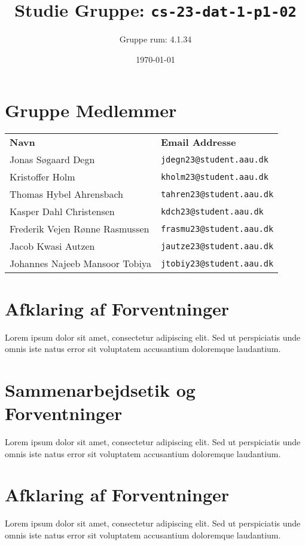 \documentclass{article}
\begin{document}
\title{Studie Gruppe: \texttt{cs-23-dat-1-p1-02}}
\author{Gruppe rum: 4.1.34}
\date{\today}
\maketitle

\section*{Gruppe Medlemmer}
\begin{tabular}{ll}
\textbf{Navn} & \textbf{Email Addresse} \\
Jonas Søgaard Degn & \texttt{jdegn23@student.aau.dk} \\
Kristoffer Holm& \texttt{kholm23@student.aau.dk} \\
Thomas Hybel Ahrensbach & \texttt{tahren23@student.aau.dk} \\
Kasper Dahl Christensen & \texttt{kdch23@student.aau.dk} \\
Frederik Vejen Rønne Rasmussen & \texttt{frasmu23@student.aau.dk} \\
Jacob Kwasi Autzen & \texttt{jautze23@student.aau.dk} \\
Johannes Najeeb Mansoor Tobiya & \texttt{jtobiy23@student.aau.dk} \\
\end{tabular}



\section*{Afklaring af Forventninger}
Lorem ipsum dolor sit amet, consectetur adipiscing elit. Sed ut perspiciatis unde omnis iste natus error sit voluptatem accusantium doloremque laudantium.


\section*{Sammenarbejdsetik og Forventninger}
Lorem ipsum dolor sit amet, consectetur adipiscing elit. Sed ut perspiciatis unde omnis iste natus error sit voluptatem accusantium doloremque laudantium.


\section*{Afklaring af Forventninger}
Lorem ipsum dolor sit amet, consectetur adipiscing elit. Sed ut perspiciatis unde omnis iste natus error sit voluptatem accusantium doloremque laudantium.
\end{document}
